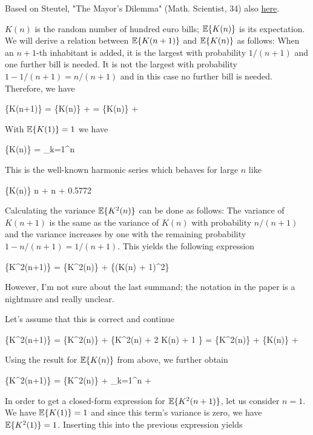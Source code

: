 
Based on Steutel, "The Mayor's Dilemma" (Math. Scientist, 34) also  \href{files/34_2_1.pdf}{here}.

$K(n)$ is the random number of hundred euro bills; $\mathbb{E}\{K(n)\}$ is its expectation. We will derive a relation between $\mathbb{E}\{K(n+1)\}$ and $\mathbb{E}\{K(n)\}$ as follows: When an $n+1$-th inhabitant is added, it is the largest with probability $1/(n+1)$ and one further bill is needed. It is not the largest with probability $1 - 1/(n+1) = n/(n+1)$ and in this case no further bill is needed. Therefore, we have 

\bee
\mE\{K(n+1)\} = \mE\{K(n)\} + \left[ \mE\{K(n)\}+1 \right] = \mE\{K(n)\} + 
\eee

With $\mathbb{E}\{K(1)\} = 1$ we have

\bee
\mE\{K(n)\} = \sum_{k=1}^n 
\eee

This is the well-known harmonic series which behaves for large $n$ like

\bee
\mE\{K(n)\} \approx \log n + \gamma \approx \log n + 0.5772
\eee

Calculating the variance $\mathbb{E}\{K^2(n)\}$ can be done as follows: The variance of $K(n+1)$ is the same as the variance of $K(n)$ with probability $n/(n+1)$ and the variance increases by one with the remaining probability $1 - n/(n+1) = 1/(n+1)$. This yields the following expression

\be
\label{2017-11-16:eq1}
\mE\{K^2(n+1)\} =  \mE\{K^2(n)\} +  \mE\{(K(n) + 1)^2\}
\ee

However, I'm not sure about the last summand; the notation in the paper is a nightmare and really unclear.

Let's assume that this is correct and continue

\bee
\mE\{K^2(n+1)\} =  \mE\{K^2(n)\} +  \mE\{K^2(n) + 2 K(n) + 1 \} = \mE\{K^2(n)\} +  \mE\{K(n)\} + 
\eee

Using the result for $\mathbb{E}\{K(n)\}$ from above, we further obtain

\bee
\mE\{K^2(n+1)\} = \mE\{K^2(n)\} +  \sum_{k=1}^n  + 
\eee

In order to get a closed-form expression for $\mathbb{E}\{K^2(n+1)\}$, let us consider $n=1$. We have $\mathbb{E}\{K(1)\} = 1$ and since this term's variance is zero, we have $\mathbb{E}\{K^2(1)\} = 1$. Inserting this into the previous expression yields

